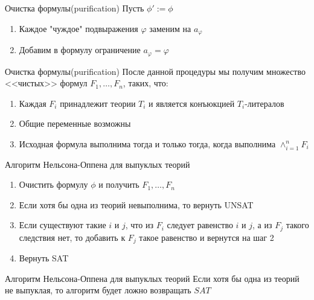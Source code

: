 \documentclass{beamer}
\begin{document}
\begin{frame}{Очистка формулы(purification)}
Пусть $\phi' := \phi$
\begin{enumerate}
\item Каждое "чуждое" подвыражения $\varphi$ заменим на $a_{\varphi}$
\item Добавим в формулу ограничение $a_{\varphi} = \varphi$
\end{enumerate}
\end{frame}

\begin{frame}{Очистка формулы(purification)}
После данной процедуры мы получим множество <<чистых>> формул $F_1, \dots, F_n$, таких, что:
\begin{enumerate}
\item Каждая $F_i$ принадлежит теории $T_i$ и является конъюкцией $T_i$-литералов
\item Общие переменные возможны
\item Исходная формула выполнима тогда и только тогда, когда выполнима $\wedge_{i=1}^{n}F_i$
\end{enumerate}
\end{frame}

\begin{frame}{Алгоритм Нельсона-Оппена для выпуклых теорий}
\begin{enumerate}
\item Очистить формулу $\phi$ и получить $F_1, \dots, F_n$
\item Если хотя бы одна из теорий невыполнима, то вернуть UNSAT
\item Если существуют такие $i$ и $j$, что из $F_i$ следует равенство $i$ и $j$, а из $F_j$ такого следствия нет, то добавить к
$F_j$ такое равенство и вернутся на шаг 2
\item Вернуть SAT
\end{enumerate}
\end{frame}

\begin{frame}{Алгоритм Нельсона-Оппена для выпуклых теорий}
Если хотя бы одна из теорий не выпуклая, то алгоритм будет ложно возвращать $SAT$
\end{frame}
\end{document}
